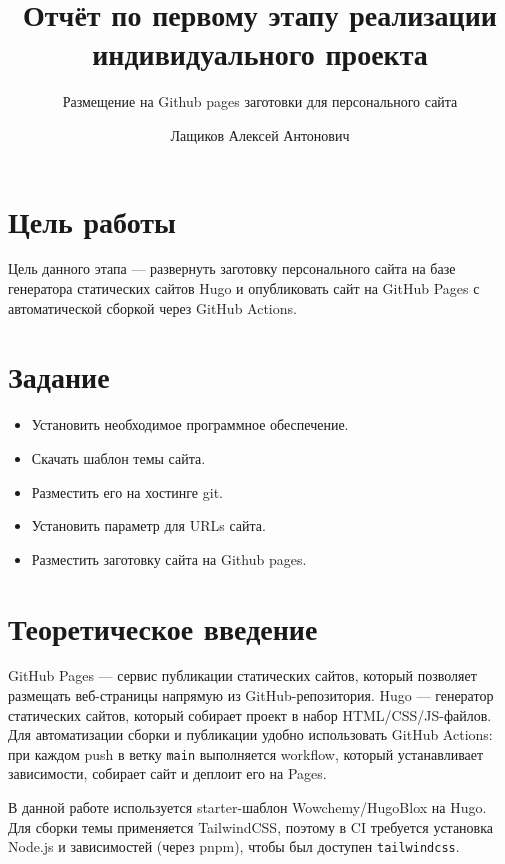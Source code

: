 \documentclass[
  12pt,
]{article}
\title{Отчёт по первому этапу реализации индивидуального проекта}
\subtitle{Размещение на Github pages заготовки для персонального сайта}
\author{Лащиков Алексей Антонович}
\date{}
\providecommand{\tightlist}{%
  \setlength{\itemsep}{0pt}\setlength{\parskip}{0pt}}
\renewcommand*\contentsname{Table of contents}
\newcommand\contentsname{Table of contents}
\begin{document}
\maketitle

\renewcommand*\contentsname{Содержание}
{
\hypersetup{linkcolor=}
\setcounter{tocdepth}{3}
\tableofcontents
}

\section{Цель
работы}\label{ux446ux435ux43bux44c-ux440ux430ux431ux43eux442ux44b}

Цель данного этапа --- развернуть заготовку персонального сайта на базе
генератора статических сайтов Hugo и опубликовать сайт на GitHub Pages с
автоматической сборкой через GitHub Actions.

\section{Задание}\label{ux437ux430ux434ux430ux43dux438ux435}

\begin{itemize}
\tightlist
\item
  Установить необходимое программное обеспечение.
\item
  Скачать шаблон темы сайта.
\item
  Разместить его на хостинге git.
\item
  Установить параметр для URLs сайта.
\item
  Разместить заготовку сайта на Github pages.
\end{itemize}

\section{Теоретическое
введение}\label{ux442ux435ux43eux440ux435ux442ux438ux447ux435ux441ux43aux43eux435-ux432ux432ux435ux434ux435ux43dux438ux435}

GitHub Pages --- сервис публикации статических сайтов, который позволяет
размещать веб-страницы напрямую из GitHub-репозитория. Hugo ---
генератор статических сайтов, который собирает проект в набор
HTML/CSS/JS-файлов. Для автоматизации сборки и публикации удобно
использовать GitHub Actions: при каждом push в ветку \texttt{main}
выполняется workflow, который устанавливает зависимости, собирает сайт и
деплоит его на Pages.

В данной работе используется starter-шаблон Wowchemy/HugoBlox на Hugo.
Для сборки темы применяется TailwindCSS, поэтому в CI требуется
установка Node.js и зависимостей (через pnpm), чтобы был доступен
\texttt{tailwindcss}.
\end{document}
